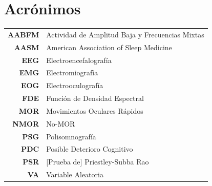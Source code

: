 \documentclass[12pt,letterpaper]{book}
\begin{document}
\chapter*{Acrónimos}

\begin{tabular}{rl}
\textbf{AABFM} & Actividad de Amplitud Baja y Frecuencias Mixtas
\\
\textbf{AASM} & American Association of Sleep Medicine
\\
\textbf{EEG} & Electroencefalografía
\\
\textbf{EMG} & Electromiografía
\\
\textbf{EOG} & Electrooculografía
\\
\textbf{FDE} & Función de Densidad Espectral
\\
\textbf{MOR} & Movimientos Oculares Rápidos
\\
\textbf{NMOR}& No-MOR
\\
\textbf{PSG} & Polisomnografía
\\
\textbf{PDC} & Posible Deterioro Cognitivo
\\
\textbf{PSR} & [Prueba de] Priestley-Subba Rao
\\
\textbf{VA} & Variable Aleatoria
\\
\end{tabular}

\newpage


\thispagestyle{empty}

\tableofcontents
\newpage


\setcounter{page}{1}

\end{document}
